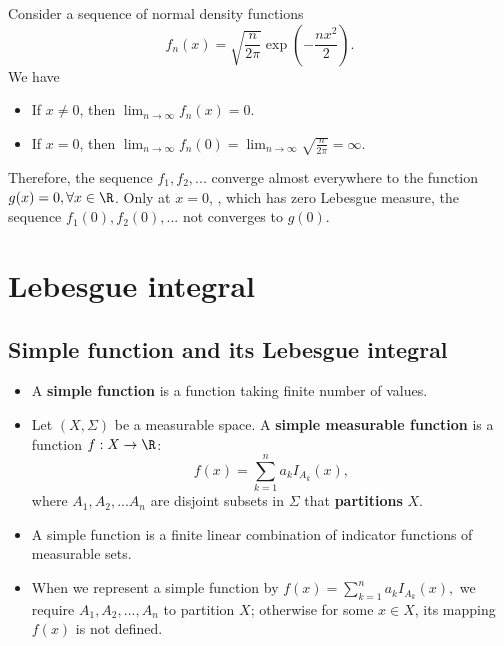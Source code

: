 \begin{refsection}
\begin{example}\cite[24]{shreve2004stochastic2}
Consider a sequence of normal density functions
$$f_n(x) = \sqrt{\frac{n}{2\pi}}\exp(-\frac{nx^2}{2}).$$
We have
\begin{itemize}
	\item If $x\neq 0$, then $\lim_{n\to \infty} f_n(x) = 0$.
	\item If $x = 0$, then $\lim_{n\to \infty} f_n(0) = \lim_{n\to \infty} \sqrt{\frac{n}{2\pi}} = \infty$.
\end{itemize}
Therefore, the sequence $f_1,f_2,...$ converge almost everywhere to the function $g(x) = 0,\forall x\in \R$. 
Only at $x = 0$, , which has zero Lebesgue measure, the sequence $f_1(0),f_2(0),...$ not converges to $g(0)$.
\end{example}



\section{Lebesgue integral}

\subsection{Simple function and its Lebesgue integral }



\begin{definition}\cite[364]{johnsonbaugh2010foundations}\hfill
\begin{itemize}
	\item A \textbf{simple function} is a function taking finite number of values.
	\item Let $(X,\Sigma)$ be a measurable space.  A \textbf{simple measurable function} is a function $f:X\rightarrow \R$:
	$$f(x) = \sum_{k=1}^n a_k I_{A_k}(x),$$
	where $A_1,A_2,...A_n$ are disjoint subsets in $\Sigma$ that \textbf{partitions} $X$.
\end{itemize}	
\end{definition}

\begin{remark}\hfill
\begin{itemize}
	\item A simple function is a finite linear combination of indicator functions of measurable sets.
	\item When we represent a simple function by $f(x) = \sum_{k=1}^n a_k I_{A_k}(x),$ we require $A_1,A_2,...,A_n$ to partition $X$; otherwise for some $x\in X$, its mapping $f(x)$ is not defined.
\end{itemize}	
\end{remark}



\end{refsection}
